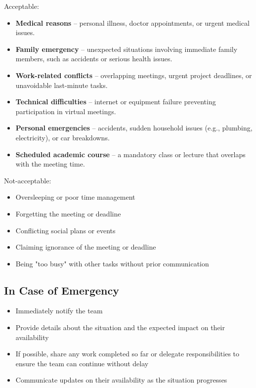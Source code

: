 \documentclass{article}
\begin{document}
Acceptable:\\
\begin {itemize}
    \item \textbf{Medical reasons} – personal illness, doctor appointments, or urgent medical issues.
    \item \textbf{Family emergency} – unexpected situations involving immediate family members, such as accidents or serious health issues.
    \item \textbf{Work-related conflicts} – overlapping meetings, urgent project deadlines, or unavoidable last-minute tasks. 
    \item \textbf{Technical difficulties} – internet or equipment failure preventing participation in virtual meetings.
    \item \textbf{Personal emergencies} – accidents, sudden household issues (e.g., plumbing, electricity), or car breakdowns.
    \item \textbf{Scheduled academic course} – a mandatory class or lecture that overlaps with the meeting time.
\end{itemize}


Not-acceptable:\\

\begin{itemize}
    \item Oversleeping or poor time management
    \item Forgetting the meeting or deadline
    \item Conflicting social plans or events
    \item Claiming ignorance of the meeting or deadline
    \item Being "too busy" with other tasks without prior communication
\end{itemize}

\subsection{In Case of Emergency}

\begin{itemize}
    \item Immediately notify the team
    \item Provide details about the situation and the expected impact on their availability
    \item If possible, share any work completed so far or delegate responsibilities to ensure the team can continue without delay
    \item Communicate updates on their availability as the situation progresses
\end{itemize}
\end{document}
